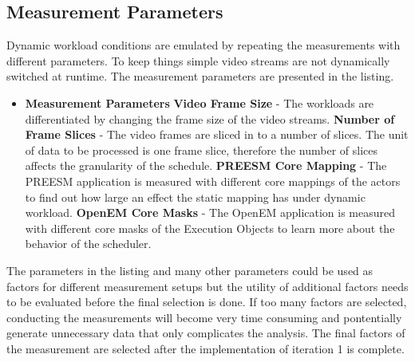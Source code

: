 \subsection{Measurement Parameters}
Dynamic workload conditions are emulated by repeating the measurements with different parameters. To keep things simple video streams are not dynamically switched at runtime. The measurement parameters are presented in the listing.

\begin{itemize}\label{itm:params}
\item[] \textbf{Measurement Parameters}
    \subitem \textbf{Video Frame Size} - The workloads are differentiated by changing the frame size of the video streams.
    \subitem \textbf{Number of Frame Slices} - The video frames are sliced in to a number of slices. The unit of data to be processed is one frame slice, therefore the number of slices affects the granularity of the schedule.
    \subitem \textbf{PREESM Core Mapping} - The PREESM application is measured with different core mappings of the actors to find out how large an effect the static mapping has under dynamic workload.
    \subitem \textbf{OpenEM Core Masks} - The OpenEM application is measured with different core masks of the Execution Objects to learn more about the behavior of the scheduler.
\end{itemize}

The parameters in the listing and many other parameters could be used as factors for different measurement setups but the utility of additional factors needs to be evaluated before the final selection is done. If too many factors are selected, conducting the measurements will become very time consuming and pontentially generate unnecessary data that only complicates the analysis. The final factors of the measurement are selected after the implementation of iteration 1 is complete.
